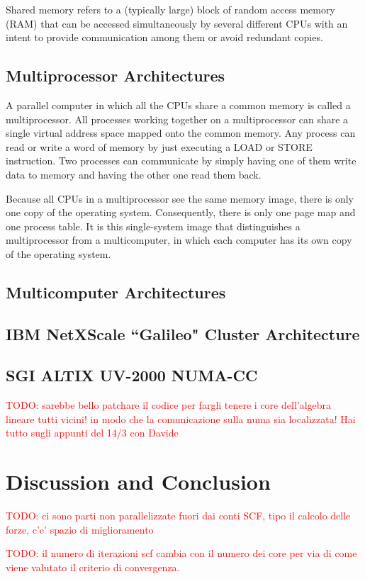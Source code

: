 \documentclass[a4paper,12pt]{article}
\newcommand\mynotes[1]{\begin{flushright}

\textcolor{red}{TODO: #1}\end{flushright}}
\begin{document}
Shared memory refers to a (typically large) block of random access memory (RAM) that can be accessed simultaneously by several different CPUs with an intent to provide communication among them or avoid redundant copies.


\subsection{Multiprocessor Architectures}
A parallel computer in which all the CPUs share a common memory is called a multiprocessor. 
All processes working together on a multiprocessor can share a single virtual address space mapped onto the common memory. 
Any process can read or write a word of memory by just executing a LOAD or STORE instruction.
Two processes can communicate by simply having one of them write data to memory and having the other one read them back.

Because all CPUs in a multiprocessor see the same memory image, there is only one copy of the operating system. 
Consequently, there is only one page map and one process table. 
It is this single-system image that distinguishes a multiprocessor from a multicomputer, in which each computer has its own copy of the operating system.


\subsection{Multicomputer Architectures}

\subsection{IBM NetXScale ``Galileo" Cluster Architecture}\label{galileoarch:sec}
\subsection{SGI ALTIX UV-2000 NUMA-CC}\label{numaarch:sec}

\mynotes{sarebbe bello patchare il codice per fargli tenere i core dell'algebra lineare tutti vicini! in modo che la comunicazione sulla numa sia localizzata! Hai tutto sugli appunti del 14/3 con Davide}

\section{Discussion and Conclusion}

\mynotes{ci sono parti non parallelizzate fuori dai conti SCF, tipo il calcolo delle forze, c'e' spazio di miglioramento}
\mynotes{il numero di iterazioni scf cambia con il numero dei core per via di come viene valutato il criterio di convergenza.}
\end{document}

